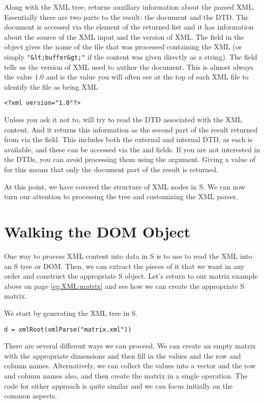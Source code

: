 Along with the XML tree,  returns auxillary
information about the parsed XML.  Essentially there are two parts to
the result: the document and the DTD.  The document is accessed via
the  element of the returned list and it has information
about the source of the XML input and the version of XML.  The
 field in the  object gives the name of the
file that was processed containing the XML (or simply
\verb+"&lt;buffer&gt;"+ if the content was given directly as a string).
The  field tells us the version of XML used to author
the document.  This is almost always the value $1.0$ and is the value
you will often see at the top of each XML file to identify the file as
being XML
\begin{verbatim}
<?xml version="1.0"?>
\end{verbatim}

Unless you ask it not to,  will try to read
the DTD associated with the XML content.  And it returns this
information as the second part of the result returned from
 via the  field.  This includes
both the external and internal DTD, as each is available, and these
can be accessed via the  and 
fields.  
If you are not interested in the DTDs, you can avoid processing them
using the  argument.  Giving a value of \SFalse{} for
this means that only the document part of the result is returned.

At this point, we have covered the structure of XML nodes in S.  We
can now turn our attention to processing the tree and customizing the
XML parser.


\section{Walking the DOM Object}
One way to process XML content into data in S is to use
 to read the XML into an S tree or DOM.  Then,
we can extract the pieces of it that we want in any order and
construct the appropriate S object.  Let's return to our matrix
example above on page \ref{eg:XML:matrix} and see how we can create
the appropriate S matrix.

We start by generating the XML tree in S.
\begin{verbatim}
d = xmlRoot(xmlParse("matrix.xml"))
\end{verbatim}
There are several different ways we can proceed.  We can create an
empty matrix with the appropriate dimensions and then fill in the
values and the row and column names.  Alternatively, we can collect
the values into a vector and the row and column names also, and then
create the matrix in a single operation.  The code for either approach
is quite similar and we can focus initially on the common aspects.  


